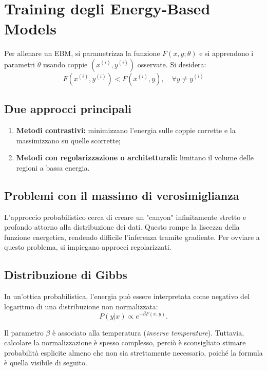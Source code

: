 \section{Training degli Energy-Based Models}

Per allenare un EBM, si parametrizza la funzione $F(x, y; \theta)$ e si apprendono i parametri $\theta$ usando coppie $(x^{(i)}, y^{(i)})$ osservate. Si desidera:
\begin{equation}
    F(x^{(i)}, y^{(i)}) < F(x^{(i)}, y), \quad \forall y \neq y^{(i)}
\end{equation}

\subsection{Due approcci principali}
\begin{enumerate}
    \item \textbf{Metodi contrastivi:} minimizzano l'energia sulle coppie corrette e la massimizzano su quelle scorrette;
    \item \textbf{Metodi con regolarizzazione o architetturali:} limitano il volume delle regioni a bassa energia.
\end{enumerate}

\subsection{Problemi con il massimo di verosimiglianza}
L'approccio probabilistico cerca di creare un "canyon" infinitamente stretto e profondo attorno alla distribuzione dei dati. Questo rompe la liscezza della funzione energetica, rendendo difficile l'inferenza tramite gradiente. Per ovviare a questo problema, si impiegano approcci regolarizzati.

\subsection{Distribuzione di Gibbs}
In un'ottica probabilistica, l'energia può essere interpretata come negativo del logaritmo di una distribuzione non normalizzata:
\begin{equation*}
    P(y|x) \propto e^{-\beta F(x, y)}.
\end{equation*}

Il parametro $\beta$ è associato alla temperatura (\emph{inverse temperature}). Tuttavia, calcolare la normalizzazione è spesso complesso, perciò è sconsigliato stimare probabilità esplicite almeno che non sia strettamente necessario, poiché la formula è quella visibile di seguito.


